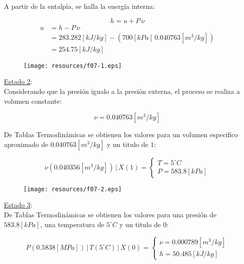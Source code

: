 \documentclass[letter,11pt]{article}
\begin{document}
\begin{enumerate}
A partir de la entalpía, se halla la energía interna:

\begin{equation*}
    h = u + P\,\nu
\end{equation*}
\begin{equation*}
    \begin{split}
        u &= h - P\,\nu \\
            &= 283.282[kJ/kg] - (700[kPa]\,0.040763[m^3/kg]) \\
            &= 254.75[kJ/kg]
    \end{split}
\end{equation*}

\begin{figure}[H]
\centering
\texttt{[image: resources/f07-1.eps]}
\end{figure}

\underline{Estado 2}: \\
Considerando que la presión igualo a la presión externa, el proceso se realiza
a volumen constante:

\begin{equation*}
    \nu = 0.040763[m^3/kg]
\end{equation*}

De Tablas Termodinámicas se obtienen los valores para un volumen especifico
aproximado de $0.040763[m^3/kg]$ y un titulo de $1$:

\begin{equation*}
    \nu(0.040356[m^3/kg])\,|\,X(1) = \begin{cases}
        T = 5^\circ C \\
        P = 583.8[kPa]
    \end{cases}
\end{equation*}

\begin{figure}[H]
\centering
\texttt{[image: resources/f07-2.eps]}
\end{figure}

\underline{Estado 3}: \\
De Tablas Termodinámicas se obtienen los valores para una presión de
$583.8[kPa]$, una temperatura de $5^\circ C$ y un titulo de $0$:

\begin{equation*}
    P(0.5838[MPa])\,|\,T(5^\circ C)\,|\,X(0) = \begin{cases}
        \nu = 0.000789[m^3/kg] \\
        h = 50.485[kJ/kg]
    \end{cases}
\end{equation*}


\end{enumerate}
\end{document}
